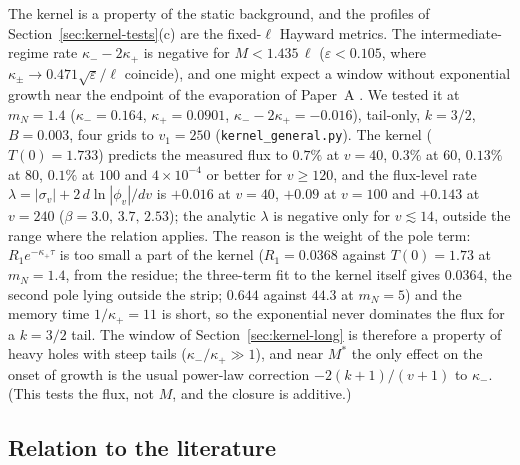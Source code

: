 \documentclass[11pt]{article}
\begin{document}
The kernel is a property of the static background, and the profiles of Section~\ref{sec:kernel-tests}(c) are the fixed-$\ell$ Hayward metrics. The intermediate-regime rate $\kappa_--2\kappa_+$ is negative for $M<1.435\,\ell$ ($\varepsilon<0.105$, where $\kappa_\pm\to0.471\sqrt\varepsilon/\ell$ coincide), and one might expect a window without exponential growth near the endpoint of the evaporation of Paper~A \citep{PaperA}. We tested it at $m_N=1.4$ ($\kappa_-=0.164$, $\kappa_+=0.0901$, $\kappa_--2\kappa_+=-0.016$), tail-only, $k=3/2$, $B=0.003$, four grids to $v_1=250$ (\texttt{kernel\_general.py}). The kernel ($T(0)=1.733$) predicts the measured flux to $0.7\%$ at $v=40$, $0.3\%$ at $60$, $0.13\%$ at $80$, $0.1\%$ at $100$ and $4\times10^{-4}$ or better for $v\ge120$, and the flux-level rate $\lambda=|\sigma_v|+2\,d\ln|\phi_v|/dv$ is $+0.016$ at $v=40$, $+0.09$ at $v=100$ and $+0.143$ at $v=240$ ($\beta=3.0,\,3.7,\,2.53$); the analytic $\lambda$ is negative only for $v\lesssim14$, outside the range where the relation applies. The reason is the weight of the pole term: $R_1e^{-\kappa_+\tau}$ is too small a part of the kernel ($R_1=0.0368$ against $T(0)=1.73$ at $m_N=1.4$, from the residue; the three-term fit to the kernel itself gives $0.0364$, the second pole lying outside the strip; $0.644$ against $44.3$ at $m_N=5$) and the memory time $1/\kappa_+=11$ is short, so the exponential never dominates the flux for a $k=3/2$ tail. The window of Section~\ref{sec:kernel-long} is therefore a property of heavy holes with steep tails ($\kappa_-/\kappa_+\gg1$), and near $M^*$ the only effect on the onset of growth is the usual power-law correction $-2(k+1)/(v+1)$ to $\kappa_-$. (This tests the flux, not $M$, and the closure is additive.)

\subsection{Relation to the literature}
\label{sec:kernel-lit}
\end{document}
